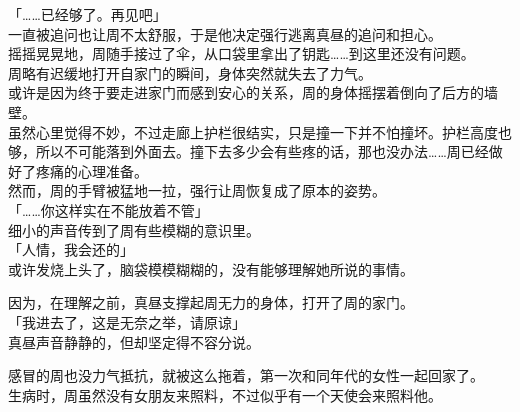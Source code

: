 「……已经够了。再见吧」\\

一直被追问也让周不太舒服，于是他决定强行逃离真昼的追问和担心。\\

摇摇晃晃地，周随手接过了伞，从口袋里拿出了钥匙……到这里还没有问题。\\

周略有迟缓地打开自家门的瞬间，身体突然就失去了力气。\\

或许是因为终于要走进家门而感到安心的关系，周的身体摇摆着倒向了后方的墙壁。\\

虽然心里觉得不妙，不过走廊上护栏很结实，只是撞一下并不怕撞坏。护栏高度也够，所以不可能落到外面去。撞下去多少会有些疼的话，那也没办法……周已经做好了疼痛的心理准备。\\

然而，周的手臂被猛地一拉，强行让周恢复成了原本的姿势。\\

「……你这样实在不能放着不管」\\

细小的声音传到了周有些模糊的意识里。\\

「人情，我会还的」\\

或许发烧上头了，脑袋模模糊糊的，没有能够理解她所说的事情。

因为，在理解之前，真昼支撑起周无力的身体，打开了周的家门。\\

「我进去了，这是无奈之举，请原谅」\\

真昼声音静静的，但却坚定得不容分说。

感冒的周也没力气抵抗，就被这么拖着，第一次和同年代的女性一起回家了。\\

生病时，周虽然没有女朋友来照料，不过似乎有一个天使会来照料他。
